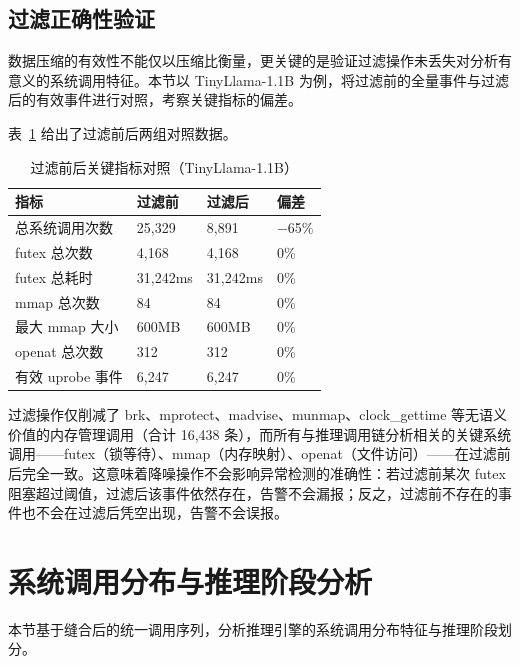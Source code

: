 \subsection{过滤正确性验证}

数据压缩的有效性不能仅以压缩比衡量，更关键的是验证过滤操作未丢失对分析有意义的系统调用特征。本节以 TinyLlama-1.1B 为例，将过滤前的全量事件与过滤后的有效事件进行对照，考察关键指标的偏差。

表~\ref{tab:filter_validation} 给出了过滤前后两组对照数据。

\begin{table}[H]
    \centering
    \caption{过滤前后关键指标对照（TinyLlama-1.1B）}
    \label{tab:filter_validation}
    \begin{tabular}{|p{4cm}|p{3cm}|p{3cm}|p{3cm}|}
        \hline
        \textbf{指标} & \textbf{过滤前} & \textbf{过滤后} & \textbf{偏差} \\
        \hline
        总系统调用次数 & 25,329 & 8,891 & $-$65\% \\
        \hline
        futex 总次数 & 4,168 & 4,168 & 0\% \\
        \hline
        futex 总耗时 & 31,242ms & 31,242ms & 0\% \\
        \hline
        mmap 总次数 & 84 & 84 & 0\% \\
        \hline
        最大 mmap 大小 & 600MB & 600MB & 0\% \\
        \hline
        openat 总次数 & 312 & 312 & 0\% \\
        \hline
        有效 uprobe 事件 & 6,247 & 6,247 & 0\% \\
        \hline
    \end{tabular}
\end{table}

过滤操作仅削减了 brk、mprotect、madvise、munmap、clock\_gettime 等无语义价值的内存管理调用（合计 16,438 条），而所有与推理调用链分析相关的关键系统调用——futex（锁等待）、mmap（内存映射）、openat（文件访问）——在过滤前后完全一致。这意味着降噪操作不会影响异常检测的准确性：若过滤前某次 futex 阻塞超过阈值，过滤后该事件依然存在，告警不会漏报；反之，过滤前不存在的事件也不会在过滤后凭空出现，告警不会误报。

\section{系统调用分布与推理阶段分析}

本节基于缝合后的统一调用序列，分析推理引擎的系统调用分布特征与推理阶段划分。

